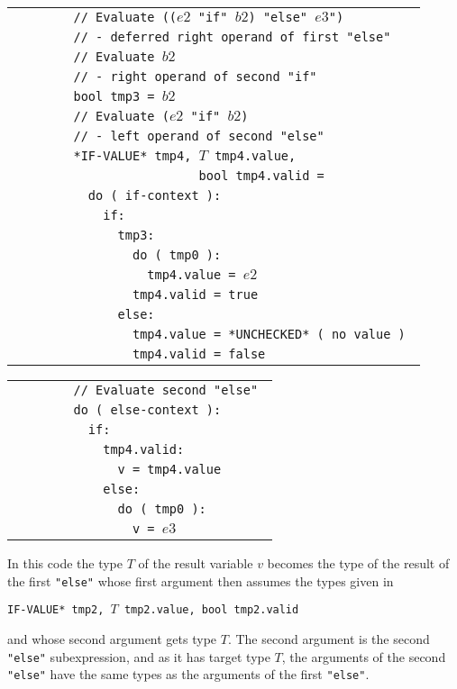 \documentclass[12pt]{article}
\newenvironment{indpar}[1][0.3in]%
	{\begin{list}{}%
		     {\setlength{\itemsep}{0in}%
		      \setlength{\topsep}{0in}%
		      \setlength{\parsep}{1ex}%
		      \setlength{\labelwidth}{#1}%
		      \setlength{\leftmargin}{#1}%
		      \addtolength{\leftmargin}{\labelsep}}%
	 \item}%
	{\end{list}}
\begin{document}
\begin{indpar}
\begin{tabular}{l}
\tt ~~~~~~~~// Evaluate (($e2$ "if" $b2$) "else" $e3$") \\
\tt ~~~~~~~~// - deferred right operand of first "else" \\
\tt ~~~~~~~~// Evaluate $b2$ \\
\tt ~~~~~~~~// - right operand of second "if" \\
\tt ~~~~~~~~bool tmp3 = $b2$ \\
\tt ~~~~~~~~// Evaluate ($e2$ "if" $b2$) \\
\tt ~~~~~~~~// - left operand of second "else" \\
\tt ~~~~~~~~*IF-VALUE* tmp4, $T$ tmp4.value, \\
\tt ~~~~~~~~~~~~~~~~~~~~~~~~~bool tmp4.valid = \\
\tt ~~~~~~~~~~do ( if-context ): \\
\tt ~~~~~~~~~~~~if: \\
\tt ~~~~~~~~~~~~~~tmp3: \\
\tt ~~~~~~~~~~~~~~~~do ( tmp0 ): \\
\tt ~~~~~~~~~~~~~~~~~~tmp4.value = $e2$ \\
\tt ~~~~~~~~~~~~~~~~tmp4.valid = true \\
\tt ~~~~~~~~~~~~~~else: \\
\tt ~~~~~~~~~~~~~~~~tmp4.value = *UNCHECKED* ( no value ) \\
\tt ~~~~~~~~~~~~~~~~tmp4.valid = false \\
\end{tabular}

\begin{tabular}{l}
\tt ~~~~~~~~// Evaluate second "else" \\
\tt ~~~~~~~~do ( else-context ): \\
\tt ~~~~~~~~~~if: \\
\tt ~~~~~~~~~~~~tmp4.valid: \\
\tt ~~~~~~~~~~~~~~v = tmp4.value \\
\tt ~~~~~~~~~~~~else: \\
\tt ~~~~~~~~~~~~~~do ( tmp0 ): \\
\tt ~~~~~~~~~~~~~~~~v = $e3$ \\
\end{tabular}

\end{indpar}

In this code the type $T$ of the result variable $v$ becomes
the type of the result of the first {\tt "else"} whose
first argument then assumes the types given in
\begin{center}
\tt *IF-VALUE* tmp2, $T$ tmp2.value, bool tmp2.valid
\end{center}
and whose second argument gets type $T$.  The second argument
is the second {\tt "else"} subexpression, and as it has
target type $T$, the arguments of the second {\tt "else"}
have the same types as the arguments of the first {\tt "else"}.
\end{document}
